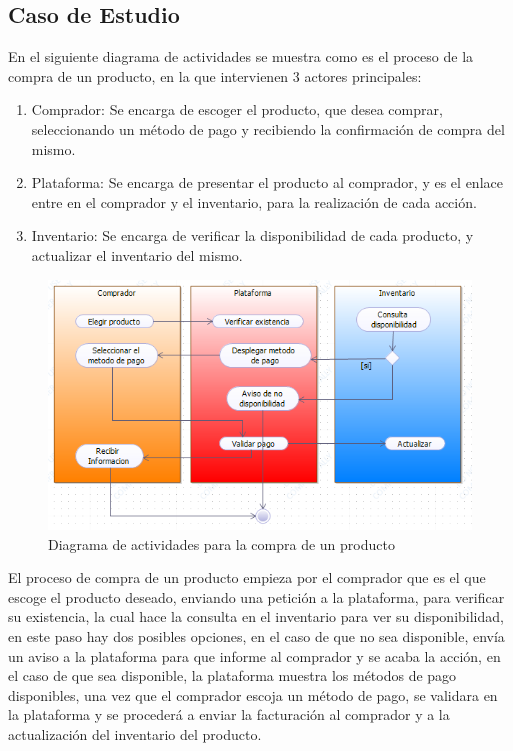 \subsection*{Caso de Estudio}

En el siguiente diagrama de actividades se muestra como es el proceso de la compra de un producto, en la que intervienen 3 actores principales:
\begin{enumerate}
	\item Comprador: Se encarga de escoger el producto, que desea comprar, seleccionando un método de pago y recibiendo la confirmación de compra del mismo.
	\item Plataforma: Se encarga de presentar el producto al comprador, y es el enlace entre en el comprador y el inventario, para la realización de cada acción.
	\item Inventario: Se encarga de verificar la disponibilidad de cada producto, y actualizar el inventario del mismo.
\end{enumerate}

\begin{figure}[th!]
	\centering
	\includegraphics[width=1\linewidth]{arquitectura/imagenes/workflow}
	\caption{Diagrama de actividades para la compra de un producto}
	\label{fig:workflow}
\end{figure}


El proceso de compra de un producto empieza por el comprador que es el que escoge el producto deseado, enviando una petición a la plataforma, para verificar su existencia, la cual hace la consulta en el inventario para ver su disponibilidad, en este paso hay dos posibles opciones, en el caso de que no sea disponible, envía un aviso a la plataforma para que informe al comprador y se acaba la acción, en el caso de que sea disponible, la plataforma muestra los métodos de pago disponibles, una vez que el comprador escoja un método de pago, se validara en la plataforma y se procederá a enviar la facturación al comprador y a la actualización del inventario del producto.

